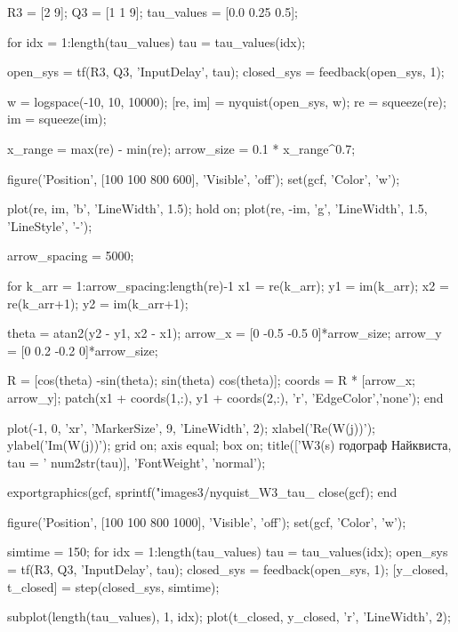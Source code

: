 \begin{matlabcode}
R3 = [2 9];
Q3 = [1 1 9];
tau_values = [0.0 0.25 0.5];

for idx = 1:length(tau_values)
    tau = tau_values(idx);
    
    open_sys = tf(R3, Q3, 'InputDelay', tau);
    closed_sys = feedback(open_sys, 1);
    
    w = logspace(-10, 10, 10000);
    [re, im] = nyquist(open_sys, w);
    re = squeeze(re);
    im = squeeze(im);
    
    x_range = max(re) - min(re);
    arrow_size = 0.1 * x_range^0.7;
    
    figure('Position', [100 100 800 600], 'Visible', 'off');
    set(gcf, 'Color', 'w');
    
    plot(re, im, 'b', 'LineWidth', 1.5);
    hold on;
    plot(re, -im, 'g', 'LineWidth', 1.5, 'LineStyle', '-');
    
    arrow_spacing = 5000;
    
    for k_arr = 1:arrow_spacing:length(re)-1
        x1 = re(k_arr);
        y1 = im(k_arr);
        x2 = re(k_arr+1);
        y2 = im(k_arr+1);
        
        theta = atan2(y2 - y1, x2 - x1);
        arrow_x = [0 -0.5 -0.5 0]*arrow_size;
        arrow_y = [0 0.2 -0.2 0]*arrow_size;
        
        R = [cos(theta) -sin(theta); sin(theta) cos(theta)];
        coords = R * [arrow_x; arrow_y];
        patch(x1 + coords(1,:), y1 + coords(2,:), 'r', 'EdgeColor','none');
    end
    
    plot(-1, 0, 'xr', 'MarkerSize', 9, 'LineWidth', 2);
    xlabel('Re(W(j\omega))');
    ylabel('Im(W(j\omega))');
    grid on;
    axis equal;
    box on;
    title(['W3(s) годограф Найквиста, tau = ' num2str(tau)], 'FontWeight', 'normal');
    
    exportgraphics(gcf, sprintf("images3/nyquist_W3_tau_%
    close(gcf);
end

figure('Position', [100 100 800 1000], 'Visible', 'off');
set(gcf, 'Color', 'w');

simtime = 150;
for idx = 1:length(tau_values)
    tau = tau_values(idx);
    open_sys = tf(R3, Q3, 'InputDelay', tau);
    closed_sys = feedback(open_sys, 1);
    [y_closed, t_closed] = step(closed_sys, simtime);
    
    subplot(length(tau_values), 1, idx);
    plot(t_closed, y_closed, 'r', 'LineWidth', 2);
    

\end{matlabcode}
